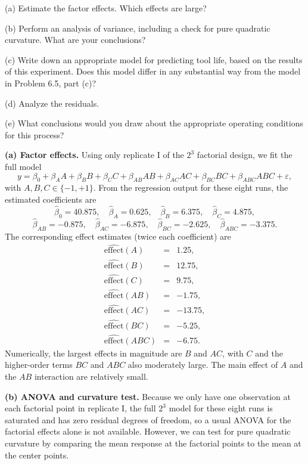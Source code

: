 \documentclass[answers,12pt,addpoints]{exam}
\begin{document}
\noindent
(a) Estimate the factor effects. Which effects are large?

\noindent
(b) Perform an analysis of variance, including a check for pure quadratic curvature. What are your conclusions?

\noindent
(c) Write down an appropriate model for predicting tool life, based on the results of this experiment. Does this model differ in any substantial way from the model in Problem 6.5, part (c)?

\noindent
(d) Analyze the residuals.

\noindent
(e) What conclusions would you draw about the appropriate operating conditions for this process?

\begin{solution}

\textbf{(a) Factor effects.}
Using only replicate I of the $2^3$ factorial design, we fit the full model
\[
y = \beta_0 + \beta_A A + \beta_B B + \beta_C C
+ \beta_{AB} AB + \beta_{AC} AC + \beta_{BC} BC + \beta_{ABC} ABC + \varepsilon,
\]
with $A,B,C \in \{-1,+1\}$. From the regression output for these eight runs, the estimated coefficients are
\[
\hat\beta_0 = 40.875,\quad
\hat\beta_A = 0.625,\quad
\hat\beta_B = 6.375,\quad
\hat\beta_C = 4.875,
\]
\[
\hat\beta_{AB} = -0.875,\quad
\hat\beta_{AC} = -6.875,\quad
\hat\beta_{BC} = -2.625,\quad
\hat\beta_{ABC} = -3.375.
\]
The corresponding effect estimates (twice each coefficient) are
\[
\begin{array}{lcl}
\hat{\text{effect}}(A) &=& 1.25,\\
\hat{\text{effect}}(B) &=& 12.75,\\
\hat{\text{effect}}(C) &=& 9.75,\\
\hat{\text{effect}}(AB) &=& -1.75,\\
\hat{\text{effect}}(AC) &=& -13.75,\\
\hat{\text{effect}}(BC) &=& -5.25,\\
\hat{\text{effect}}(ABC) &=& -6.75.
\end{array}
\]
Numerically, the largest effects in magnitude are $B$ and $AC$, with $C$ and the higher-order terms $BC$ and $ABC$ also moderately large. The main effect of $A$ and the $AB$ interaction are relatively small.

\medskip
\textbf{(b) ANOVA and curvature test.}
Because we only have one observation at each factorial point in replicate I, the full $2^3$ model for these eight runs is saturated and has zero residual degrees of freedom, so a usual ANOVA for the factorial effects alone is not available. However, we can test for pure quadratic curvature by comparing the mean response at the factorial points to the mean at the center points.


\end{solution}
\end{document}
